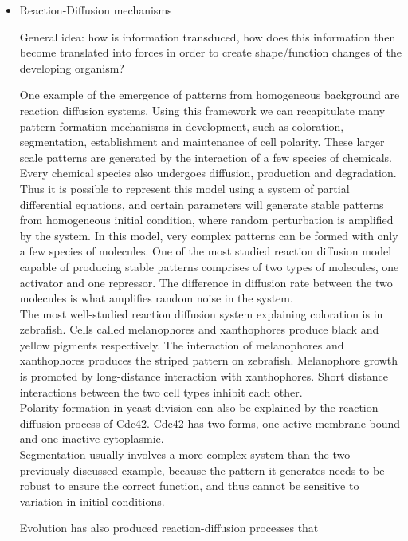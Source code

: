 \documentclass[fleqn,10pt]{wlscirep}
\begin{document}
\begin{itemize}
\item{Reaction-Diffusion mechanisms} 

General idea: how is information transduced, how does this information then become translated into forces in order to create shape/function changes of the developing organism?

One example of the emergence of patterns from homogeneous background are reaction diffusion systems. Using this framework we can recapitulate many pattern formation mechanisms in development, such as coloration, segmentation, establishment and maintenance of cell polarity. These larger scale patterns are generated by the interaction of a few species of chemicals. Every chemical species also undergoes diffusion, production and degradation. Thus it is possible to represent this model using a system of partial differential equations, and certain parameters will generate stable patterns from homogeneous initial condition, where random perturbation is amplified by the system. In this model, very complex patterns can be formed with only a few species of molecules\cite{kondo2010reaction}. One of the most studied reaction diffusion model capable of producing stable patterns comprises of two types of molecules, one activator and one repressor. The difference in diffusion rate between the two molecules is what amplifies random noise in the system.\cite{gierer1972theory}\\ 

The most well-studied reaction diffusion system explaining coloration is in zebrafish. Cells called melanophores and xanthophores produce black and yellow pigments respectively.\cite{nakamasu2009interactions} The interaction of melanophores and xanthophores produces the striped pattern on zebrafish. Melanophore growth is promoted by long-distance interaction with xanthophores. Short distance interactions between the two cell types inhibit each other. \\

Polarity formation in yeast division can also be explained by the reaction diffusion process of Cdc42. Cdc42 has two forms, one active membrane bound and one inactive cytoplasmic.  \cite{goryachev2008dynamics} \\

Segmentation usually involves a more complex system than the two previously discussed example, because the pattern it generates needs to be robust to ensure the correct function, and thus cannot be sensitive to variation in initial conditions. 

Evolution has also produced reaction-diffusion processes that 
\end{itemize}
\end{document}
